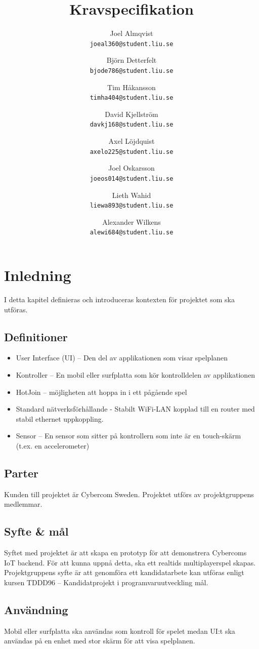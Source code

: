 \documentclass[10pt]{article}
\title{Kravspecifikation}
\author{
    Joel Almqvist\\
    \texttt{joeal360@student.liu.se}
    \and
    Björn Detterfelt\\
    \texttt{bjode786@student.liu.se}
    \and
    Tim Håkansson\\
    \texttt{timha404@student.liu.se}
    \and
    David Kjellström\\
    \texttt{davkj168@student.liu.se}
    \and
    Axel Löjdquist\\
    \texttt{axelo225@student.liu.se}
    \and
    Joel Oskarsson\\
    \texttt{joeos014@student.liu.se}
    \and
    Lieth Wahid\\
    \texttt{liewa893@student.liu.se}
    \and
    Alexander Wilkens\\
    \texttt{alewi684@student.liu.se}
}
\begin{document}
\maketitle
\pagebreak
\tableofcontents
\pagebreak
\section{Inledning}
	I detta kapitel definieras och introduceras kontexten för projektet som ska utföras.

	\subsection{Definitioner}
		\begin{itemize}
		\item User Interface (UI) -- Den del av applikationen som visar spelplanen
		\item Kontroller -- En mobil eller surfplatta som kör kontrolldelen av applikationen
		\item HotJoin -- möjligheten att hoppa in i ett pågående spel
		\item Standard nätverksförhållande - Stabilt WiFi-LAN kopplad till en router med stabil ethernet uppkoppling.
		\item Sensor -- En sensor som sitter på kontrollern som inte är en touch-skärm (t.ex. en accelerometer)
		\end{itemize}	

	\subsection{Parter}
	Kunden till projektet är Cybercom Sweden. Projektet utförs av projektgruppens medlemmar.
	\subsection{Syfte \& mål}
		Syftet med projektet är att skapa en prototyp för att demonstrera Cybercoms IoT backend. För att kunna uppnå detta, ska ett realtids multiplayerspel skapas. Projektgruppens syfte är att genomföra ett kandidatarbete kan utföras enligt kursen TDDD96 -- Kandidatprojekt i programvaruutveckling mål.
	
	\subsection{Användning}
		Mobil eller surfplatta ska användas som kontroll för spelet medan UI:t ska användas på en enhet med stor skärm för att visa spelplanen.
	
\end{document}
